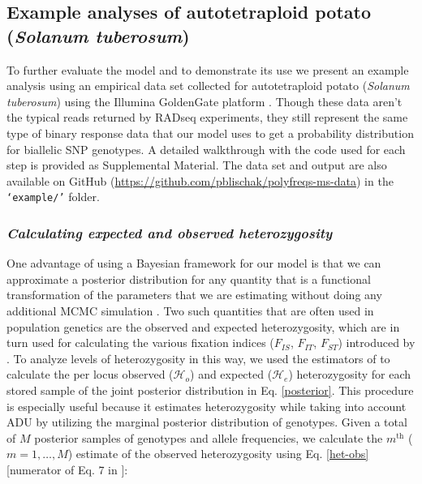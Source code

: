 \documentclass[11pt,english,letterpaper,oneside]{article}
\begin{document}
\subsection{Example analyses of autotetraploid potato (\textit{Solanum tuberosum})} %
\medskip

To further evaluate the model and to demonstrate its use we present an example analysis using an empirical data set collected for autotetraploid potato (\textit{Solanum tuberosum}) using the Illumina GoldenGate platform \citep{anithakumari2010goldenGate,voorrips2011fitTetra}. Though these data aren't the typical reads returned by RADseq experiments, they still represent the same type of binary response data that our model uses to get a probability distribution for biallelic SNP genotypes. A detailed walkthrough with the code used for each step is provided as Supplemental Material. The data set and output are also available on GitHub (\url{https://github.com/pblischak/polyfreqs-ms-data}) in the \texttt{`example/'} folder.
\medskip

\subsubsection{\itshape Calculating expected and observed heterozygosity}
\medskip

One advantage of using a Bayesian framework for our model is that we can approximate a posterior distribution for any quantity that is a functional transformation of the parameters that we are estimating without doing any additional MCMC simulation \citep{gelman2014bayesian}. Two such quantities that are often used in population genetics are the observed and expected heterozygosity, which are in turn used for calculating the various fixation indices ($F_{IS}$, $F_{IT}$, $F_{ST}$) introduced by \cite{wright1951Fstats}. To analyze levels of heterozygosity in this way, we used the estimators of \cite{hardy2015autopolyploids} to calculate the per locus observed ($\mathcal{H}_o$) and expected ($\mathcal{H}_e$) heterozygosity for each stored sample of the joint posterior distribution in Eq. \ref{posterior}. This procedure is especially useful because it estimates heterozygosity while taking into account ADU by utilizing the marginal posterior distribution of genotypes. Given a total of $M$ posterior samples of genotypes and allele frequencies, we calculate the $m^\text{th}$ ($m=1,\dots,M$) estimate of the observed heterozygosity using Eq. \ref{het-obs} [numerator of Eq. 7 in \cite{hardy2015autopolyploids}]:
\end{document}
